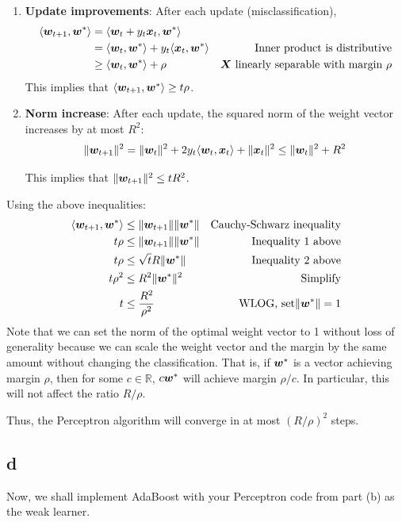 \documentclass{article}
\begin{document}
\begin{enumerate}
    \item \textbf{Update improvements}: After each update (misclassification),
    \begin{align*}
    \langle \bm{w}_{t+1}, \bm{w}^* \rangle &= \langle \bm{w}_{t} + y_t \bm{x}_{t}, \bm{w}^* \rangle\\
    &= \langle \bm{w}_{t}, \bm{w}^* \rangle + y_t \langle \bm{x}_t, \bm{w}^* \rangle&\text{Inner product is distributive}\\
    &\geq \langle \bm{w}_{t}, \bm{w}^* \rangle + \rho&\bm{X} \text{ linearly separable with margin } \rho 
    \end{align*}
    This implies that $\langle \bm{w}_{t+1}, \bm{w}^* \rangle \geq t \rho$.
    \item \textbf{Norm increase}: After each update, the squared norm of the weight vector increases by at most \(R^2\):
    $$\|\bm{w}_{t+1}\|^2 = \|\bm{w}_t\|^2 + 2y_t \langle \bm{w}_t, \bm{x}_t \rangle + \|\bm{x}_t\|^2 \leq \|\bm{w}_t\|^2 + R^2$$

    This implies that $\|\bm{w}_{t+1}\|^2 \leq t R^2$.
\end{enumerate}

Using the above inequalities:
\begin{align*}
\langle \bm{w}_{t+1}, \bm{w}^* \rangle &\leq \|\bm{w}_{t+1}\| \|\bm{w}^*\|&\text{Cauchy-Schwarz inequality}\\
t \rho &\leq \|\bm{w}_{t+1}\| \|\bm{w}^*\|&\text{Inequality 1 above}\\
t \rho &\leq \sqrt{t} R \|\bm{w}^*\|&\text{Inequality 2 above}\\
t \rho^2 &\leq R^2  \|\bm{w}^*\|^2&\text{Simplify}\\
t &\leq \frac{R^2}{\rho^2}&\text{WLOG, set}\|\bm{w}^*\| = 1
\end{align*}
Note that we can set the norm of the optimal weight vector to 1 without loss of generality because we can scale the weight vector and the margin by the same amount without changing the classification.
That is, if $\bm{w}^*$ is a vector achieving margin $\rho$, then for some $c \in \mathbb{R}$, $c\bm{w}^*$ will achieve margin $\rho/c$.
In particular, this will not affect the ratio $R/\rho$.

Thus, the Perceptron algorithm will converge in at most \( (R/\rho)^2 \) steps.

\subsection{d}
Now, we shall implement AdaBoost with your Perceptron code from part (b) as the
weak learner.
\end{document}

